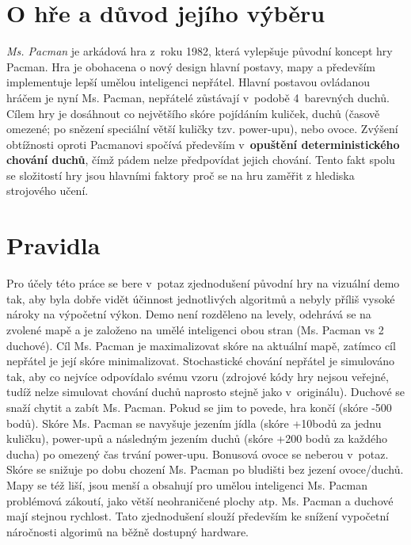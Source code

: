\section{O hře a důvod jejího výběru}
\textit{Ms. Pacman} je arkádová hra z roku 1982, která vylepšuje původní koncept hry Pacman. Hra je obohacena o nový design hlavní postavy, mapy a především implementuje lepší umělou inteligenci nepřátel. Hlavní postavou ovládanou hráčem je nyní Ms. Pacman, nepřátelé zůstávají v podobě 4 barevných duchů. Cílem hry je dosáhnout co největšího skóre pojídáním kuliček, duchů (časově omezené; po snězení speciální větší kuličky tzv. power-upu), nebo ovoce.
Zvýšení obtížnosti oproti Pacmanovi spočívá především v \textbf{opuštění deterministického chování duchů}, čímž pádem nelze předpovídat jejich chování. Tento fakt spolu se složitostí hry jsou hlavními faktory proč se na hru zaměřit z hlediska strojového učení.
\section{Pravidla}
Pro účely této práce se bere v potaz zjednodušení původní hry na vizuální demo tak, aby byla dobře vidět účinnost jednotlivých algoritmů a nebyly příliš vysoké nároky na výpočetní výkon. Demo není rozděleno na levely, odehrává se na zvolené mapě a je založeno na umělé inteligenci obou stran (Ms. Pacman vs 2 duchové). Cíl Ms. Pacman je maximalizovat skóre na aktuální mapě, zatímco cíl nepřátel je její skóre minimalizovat. Stochastické chování nepřátel je simulováno tak, aby co nejvíce odpovídalo svému vzoru (zdrojové kódy hry nejsou veřejné, tudíž nelze simulovat chování duchů naprosto stejně jako v originálu). Duchové se snaží chytit a zabít Ms. Pacman. Pokud se jim to povede, hra končí (skóre -500 bodů). Skóre Ms. Pacman se navyšuje jezením jídla (skóre +10bodů za jednu kuličku), power-upů a následným jezením duchů (skóre +200 bodů za každého ducha) po omezený čas trvání power-upu. Bonusová ovoce se neberou v potaz. Skóre se snižuje po dobu chození Ms. Pacman po bludišti bez jezení ovoce/duchů. Mapy se též liší, jsou menší a obsahují pro umělou inteligenci Ms. Pacman problémová zákoutí, jako větší neohraničené plochy atp. Ms. Pacman a duchové mají stejnou rychlost. Tato zjednodušení slouží především ke snížení vypočetní náročnosti algorimů na běžně dostupný hardware.
